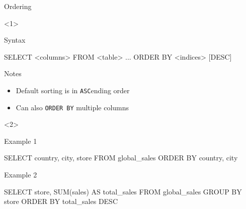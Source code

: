 \begin{frame}[t,fragile]{Ordering}
    \begin{onlyenv}<1>
        \begin{block}{Syntax}
            \begin{sql}
                SELECT <columns>
                FROM <table>
                ...
                ORDER BY <indices> [DESC]
            \end{sql}
        \end{block}
        \vfill
        \begin{block}{Notes}
            \begin{itemize}
                \item Default sorting is in \texttt{ASC}ending order
                \item Can also \texttt{ORDER BY} multiple columns
            \end{itemize}
        \end{block}
    \end{onlyenv}
    \begin{onlyenv}<2>
        \begin{block}{Example 1}
            \begin{sql}
                SELECT country, city, store
                FROM global_sales
                ORDER BY country, city
            \end{sql}
        \end{block}
        \vfill
        \begin{block}{Example 2}
            \begin{sql}
                SELECT store, SUM(sales) AS total_sales
                FROM global_sales
                GROUP BY store
                ORDER BY total_sales DESC
            \end{sql}
        \end{block}
    \end{onlyenv}
\end{frame}

